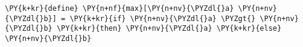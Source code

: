 \begin{Verbatim}[commandchars=\\\{\}]
\PY{k+kr}{define} \PY{n+nf}{max}[\PY{n+nv}{\PYZdl{}a} \PY{n+nv}{\PYZdl{}b}] = \PY{k+kr}{if} \PY{n+nv}{\PYZdl{}a} \PYZgt{} \PY{n+nv}{\PYZdl{}b} \PY{k+kr}{then} \PY{n+nv}{\PYZdl{}a} \PY{k+kr}{else} \PY{n+nv}{\PYZdl{}b}
\end{Verbatim}
